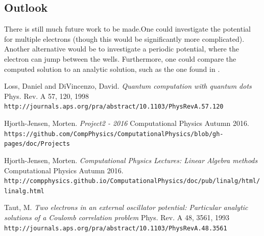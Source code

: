 \documentclass[a4paper, 10pt]{article}
\begin{document}
\subsection{Outlook}
There is still much future work to be made.One could investigate the potential for multiple electrons (though this would be significantly more complicated). Another alternative would be to investigate a periodic potential, where the electron can jump between the wells. Furthermore, one could compare the computed solution to an analytic solution, such as the one found in \cite{Analytic}.
\begin{thebibliography}{9}
Loss, Daniel and DiVincenzo, David.
\textit{Quantum computation with quantum dots}
Phys. Rev. A 57, 120, 1998
\\\texttt{http://journals.aps.org/pra/abstract/10.1103/PhysRevA.57.120}

Hjorth-Jensen, Morten.
\textit{Project2 - 2016}
Computational Physics Autumn 2016.
\\\texttt{https://github.com/CompPhysics/ComputationalPhysics/blob/gh-pages/doc/Projects}

Hjorth-Jensen, Morten.
\textit{Computational Physics Lectures: Linear Algebra methods }
Computational Physics Autumn 2016.
\\\texttt{http://compphysics.github.io/ComputationalPhysics/doc/pub/linalg/html/linalg.html}

Taut, M.
\textit{Two electrons in an external oscillator potential: Particular analytic solutions of a Coulomb correlation problem}
Phys. Rev. A 48, 3561, 1993
\\\texttt{http://journals.aps.org/pra/abstract/10.1103/PhysRevA.48.3561}





\end{thebibliography}
\end{document}
